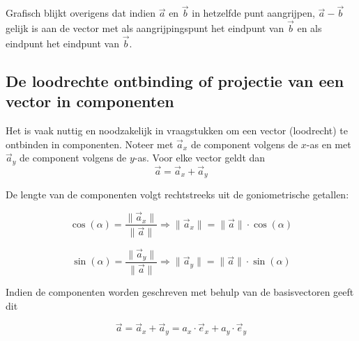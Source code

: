 \documentclass{ximera}
\begin{document}
Grafisch blijkt overigens dat indien \(\vec{a}\) en \(\vec{b}\) in hetzelfde punt aangrijpen, \(\vec{a} - \vec{b}\) gelijk is aan de vector met als aangrijpingspunt het eindpunt van \(\vec{b}\) en als eindpunt het eindpunt van \(\vec{b}\).

\subsection*{De loodrechte ontbinding of projectie van een vector in componenten}



Het is vaak nuttig en noodzakelijk in vraagstukken om een vector (loodrecht) te ontbinden in componenten. 
Noteer met \(\vec{a}_x\) de component volgens de \(x\)-as en met \(\vec{a}_y\) de component volgens de \(y\)-as. 
Voor elke vector geldt dan 
\[
\vec{a} = \vec{a}_x + \vec{a}_y
\]

De lengte van de componenten volgt rechtstreeks uit de goniometrische getallen: 

\[
\cos(\alpha) = \frac{\| \vec{a}_x \|}{\| \vec{a} \|} \Rightarrow \| \vec{a}_x \| = \|\vec{a}\| \cdot \cos(\alpha)
\]

\[
\sin(\alpha) = \frac{\| \vec{a}_y \|}{\| \vec{a} \|} \Rightarrow \| \vec{a}_y \| = \|\vec{a}\| \cdot \sin(\alpha)
\]


Indien de componenten worden geschreven met behulp van de basisvectoren geeft dit 


$$
\vec{a} = \vec{a}_x + \vec{a}_y = a_x \cdot \vec{e}_x + a_y \cdot \vec{e}_y 
$$
\end{document}
